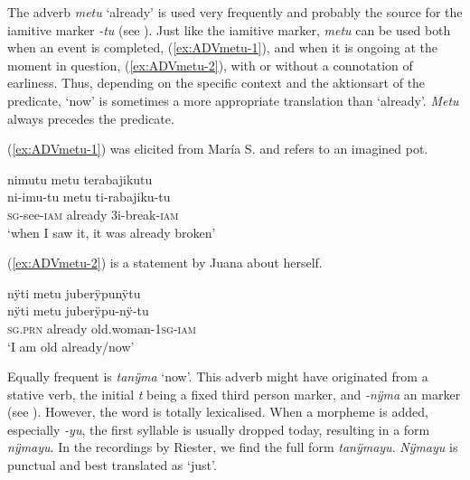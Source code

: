 



The adverb \textit{metu} ‘already’ is used very frequently and probably the source for the iamitive marker \textit{-tu} (see ). Just like the iamitive marker, \textit{metu} can be used both when an event is completed, (\ref{ex:ADVmetu-1}), and when it is ongoing at the moment in question, (\ref{ex:ADVmetu-2}), with or without a connotation of earliness. Thus, depending on the specific context and the aktionsart of the predicate, ‘now’ is sometimes a more appropriate translation than ‘already’. \textit{Metu} always precedes the predicate.

(\ref{ex:ADVmetu-1}) was elicited from María S. and refers to an imagined pot.

\ea\label{ex:ADVmetu-1}
\begingl
\glpreamble nimutu metu terabajikutu\\
\gla ni-imu-tu metu ti-rabajiku-tu\\
\textsc{sg}-see-\textsc{iam} already 3i-break-\textsc{iam}\\
\glft ‘when I saw it, it was already broken’
\endgl
{}
\xe

(\ref{ex:ADVmetu-2}) is a statement by Juana about herself.

\ea\label{ex:ADVmetu-2}
\begingl
\glpreamble nÿti metu juberÿpunÿtu\\
\gla nÿti metu juberÿpu-nÿ-tu\\
\textsc{sg.prn} already old.woman-1\textsc{sg}-\textsc{iam}\\
\glft ‘I am old already/now’
\endgl
\trailingcitation{[jxx-p110923l-1.205]}
\xe

Equally frequent is \textit{tanÿma} ‘now’. This adverb might have originated from a stative verb, the initial \textit{t} being a fixed third person marker, and \textit{-nÿma} an  marker (see ). However, the word is totally lexicalised. When a morpheme is added, especially \textit{-yu}, the first syllable is usually dropped today, resulting in a form \textit{nÿmayu}. In the recordings by Riester, we find the full form \textit{tanÿmayu}. \textit{Nÿmayu} is punctual and best translated as ‘just’.

